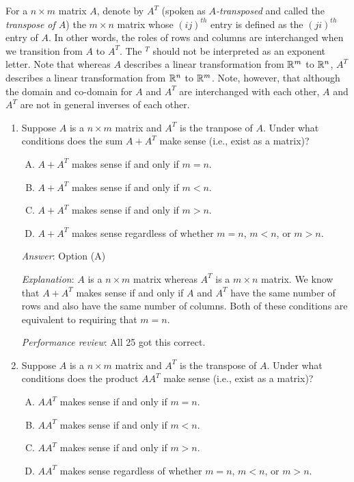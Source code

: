 \documentclass[10pt]{amsart}
\begin{document}
For a $n \times m$ matrix $A$, denote by $A^T$ (spoken as {\em
  $A$-transposed} and called the {\em transpose of $A$}) the $m \times
n$ matrix whose $(ij)^{th}$ entry is defined as the $(ji)^{th}$ entry
of $A$. In other words, the roles of rows and columns are interchanged
when we transition from $A$ to $A^T$. The ${}^T$ should not be
interpreted as an exponent letter. Note that whereas $A$ describes a
linear transformation from $\mathbb{R}^m$ to $\mathbb{R}^n$, $A^T$ describes a linear
transformation from $\mathbb{R}^n$ to $\mathbb{R}^m$. Note, however, that although the
domain and co-domain for $A$ and $A^T$ are interchanged with each
other, $A$ and $A^T$ are not in general inverses of each other.


\begin{enumerate}
\item Suppose $A$ is a $n \times m$ matrix and $A^T$ is the tranpose
  of $A$. Under what conditions does the sum $A + A^T$ make sense
  (i.e., exist as a matrix)?

  \begin{enumerate}[(A)]
  \item $A + A^T$ makes sense if and only if $m = n$.
  \item $A + A^T$ makes sense if and only if $m < n$.
  \item $A + A^T$ makes sense if and only if $m > n$.
  \item $A + A^T$ makes sense regardless of whether $m = n$, $m < n$,
    or $m > n$.
  \end{enumerate} 

  {\em Answer}: Option (A)

  {\em Explanation}: $A$ is a $n \times m$ matrix whereas $A^T$ is a
  $m \times n$ matrix. We know that $A + A^T$ makes sense if and only
  if $A$ and $A^T$ have the same number of rows and also have the same
  number of columns. Both of these conditions are equivalent to
  requiring that $m = n$.

  {\em Performance review}: All 25 got this correct.

\item Suppose $A$ is a $n \times m$ matrix and $A^T$ is the transpose
  of $A$. Under what conditions does the product $AA^T$ make sense
  (i.e., exist as a matrix)?

  \begin{enumerate}[(A)]
  \item $AA^T$ makes sense if and only if $m = n$.
  \item $AA^T$ makes sense if and only if $m < n$.
  \item $AA^T$ makes sense if and only if $m > n$.
  \item $AA^T$ makes sense regardless of whether $m = n$, $m < n$,
    or $m > n$.
  \end{enumerate} 


\end{enumerate}
\end{document}
